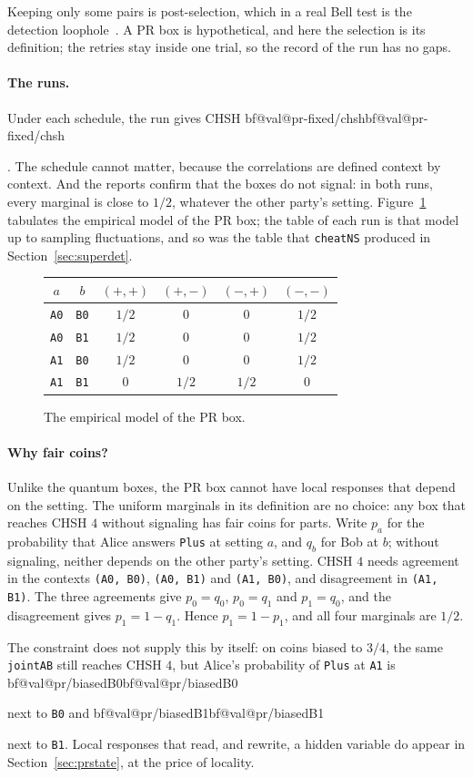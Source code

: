 \documentclass[11pt]{article}
\makeatletter
\newcommand{\hs}{\lstinline[style=hask,basicstyle=\ttfamily,frame=none]}
\newcommand{\val}[1]{\ifcsname bf@val@#1\endcsname\csname bf@val@#1\endcsname
  \else\PackageError{paper}{No value #1 in generated/values.tex}{}\fi}
\newcommand{\tA}[1]{\texttt{A#1}}
\newcommand{\tB}[1]{\texttt{B#1}}
\newcommand{\idealtable}[4]{{\small\renewcommand{\arraystretch}{1.12}%
  \begin{tabular}{@{}cc|cccc@{}}
  $a$ & $b$ & $(+,+)$ & $(+,-)$ & $(-,+)$ & $(-,-)$\\ \hline
  \tA0 & \tB0 & #1\\ \tA0 & \tB1 & #2\\ \tA1 & \tB0 & #3\\ \tA1 & \tB1 & #4
  \end{tabular}}}
\makeatother
\begin{document}
Keeping only some pairs is post-selection, which in a real Bell test is the detection loophole~\citep{Brunner2014}. A PR box is hypothetical, and here the selection is its definition; the retries stay inside one trial, so the record of the run has no gaps.

\paragraph{The runs.} Under each schedule, the run gives CHSH \val{pr-fixed/chsh}. The schedule cannot matter, because the correlations are defined context by context. And the reports confirm that the boxes do not signal: in both runs, every marginal is close to $1/2$, whatever the other party's setting. Figure~\ref{fig:pr} tabulates the empirical model of the PR box; the table of each run is that model up to sampling fluctuations, and so was the table that \hs|cheatNS| produced in Section~\ref{sec:superdet}.

\begin{figure}[htbp]
\centering
\idealtable{$1/2$ & $0$ & $0$ & $1/2$}{$1/2$ & $0$ & $0$ & $1/2$}{$1/2$ & $0$ & $0$ & $1/2$}{$0$ & $1/2$ & $1/2$ & $0$}
\caption{The empirical model of the PR box.}
\label{fig:pr}
\end{figure}

\paragraph{Why fair coins?} Unlike the quantum boxes, the PR box cannot have local responses that depend on the setting. The uniform marginals in its definition are no choice: any box that reaches CHSH $4$ without signaling has fair coins for parts. Write $p_a$ for the probability that Alice answers \hs|Plus| at setting $a$, and $q_b$ for Bob at $b$; without signaling, neither depends on the other party's setting. CHSH $4$ needs agreement in the contexts \hs|(A0, B0)|, \hs|(A0, B1)| and \hs|(A1, B0)|, and disagreement in \hs|(A1, B1)|. The three agreements give $p_0 = q_0$, $p_0 = q_1$ and $p_1 = q_0$, and the disagreement gives $p_1 = 1 - q_1$. Hence $p_1 = 1 - p_1$, and all four marginals are $1/2$.

The constraint does not supply this by itself: on coins biased to $3/4$, the same \hs|jointAB| still reaches CHSH $4$, but Alice's probability of \hs|Plus| at \hs|A1| is \val{pr/biasedB0} next to \hs|B0| and \val{pr/biasedB1} next to \hs|B1|. Local responses that read, and rewrite, a hidden variable do appear in Section~\ref{sec:prstate}, at the price of locality.
\end{document}
